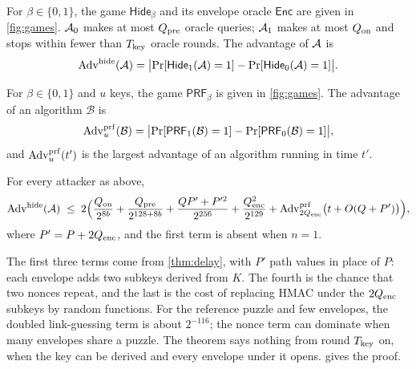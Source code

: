 \begin{definition}\label{def:hiding}
For $\beta \in \{0, 1\}$, the game $\mathsf{Hide}_\beta$ and its envelope oracle $\mathsf{Enc}$ are given in \cref{fig:games}. $\mathcal{A}_0$ makes at most $Q_{\mathrm{pre}}$ oracle queries; $\mathcal{A}_1$ makes at most $Q_{\mathrm{on}}$ and stops within fewer than $T_{\mathrm{key}}$ oracle rounds. The advantage of $\mathcal{A}$ is
\[
  \mathrm{Adv}^{\mathrm{hide}}(\mathcal{A}) = \bigl|\Pr[\mathsf{Hide}_1(\mathcal{A}) = 1] - \Pr[\mathsf{Hide}_0(\mathcal{A}) = 1]\bigr|.
\]
\end{definition}

\begin{definition}\label{def:prf}
For $\beta \in \{0, 1\}$ and $u$ keys, the game $\mathsf{PRF}_\beta$ is given in \cref{fig:games}. The advantage of an algorithm $\mathcal{B}$ is
\[
  \mathrm{Adv}^{\mathrm{prf}}_u(\mathcal{B}) = \bigl|\Pr[\mathsf{PRF}_1(\mathcal{B}) = 1] - \Pr[\mathsf{PRF}_0(\mathcal{B}) = 1]\bigr|,
\]
and $\mathrm{Adv}^{\mathrm{prf}}_u(t')$ is the largest advantage of an algorithm running in time $t'$.
\end{definition}

\begin{theorem}[Hiding]\label{thm:hiding}
For every attacker as above,
\[
  \mathrm{Adv}^{\mathrm{hide}}(\mathcal{A})
  \;\le\; 2\Bigl(\frac{Q_{\mathrm{on}}}{2^{8b}} + \frac{Q_{\mathrm{pre}}}{2^{128 + 8b}} + \frac{QP' + P'^2}{2^{256}} + \frac{Q_{\mathrm{enc}}^2}{2^{129}} + \mathrm{Adv}^{\mathrm{prf}}_{2Q_{\mathrm{enc}}}\bigl(t + O(Q + P')\bigr)\Bigr),
\]
where $P' = P + 2Q_{\mathrm{enc}}$, and the first term is absent when $n = 1$.
\end{theorem}

The first three terms come from \cref{thm:delay}, with $P'$ path values in place of $P$: each envelope adds two subkeys derived from $K$. The fourth is the chance that two nonces repeat, and the last is the cost of replacing HMAC under the $2Q_{\mathrm{enc}}$ subkeys by random functions. For the reference puzzle and few envelopes, the doubled link-guessing term is about $2^{-116}$; the nonce term can dominate when many envelopes share a puzzle. The theorem says nothing from round $T_{\mathrm{key}}$ on, when the key can be derived and every envelope under it opens.  gives the proof.

